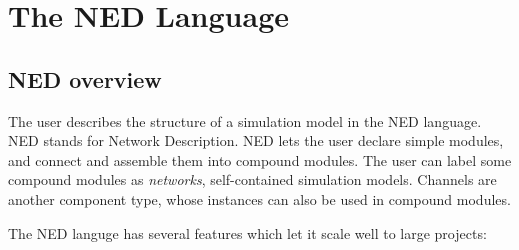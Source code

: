 \chapter{The NED Language}
\label{cha:the-ned-language}


\section{NED overview}

The user describes the structure of a simulation model in the NED language. NED
stands for Network Description. NED lets the user declare simple modules, and
connect and assemble them into compound modules. The user can label some compound
modules as \textit{networks}, self-contained simulation models. Channels are
another component type, whose instances can also be used in compound modules.

The NED languge has several features which let it scale well to large projects:

